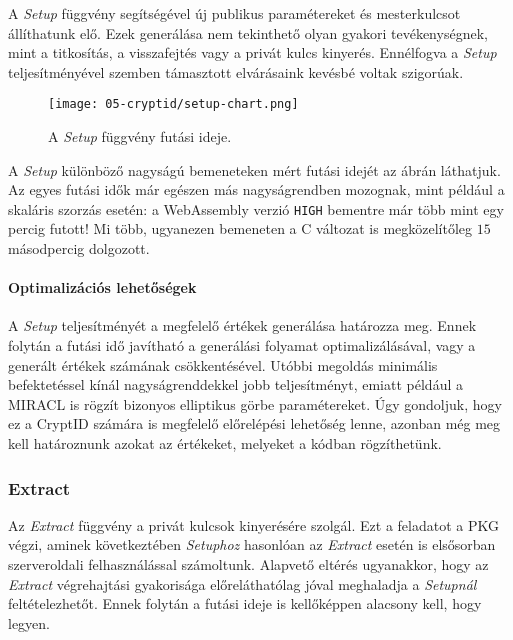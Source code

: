 A \textit{Setup} függvény segítségével új publikus paramétereket és mesterkulcsot állíthatunk elő. Ezek generálása nem tekinthető olyan gyakori tevékenységnek, mint a titkosítás, a visszafejtés vagy a privát kulcs kinyerés. Ennélfogva a \textit{Setup} teljesítményével szemben támasztott elvárásaink kevésbé voltak szigorúak.

\begin{figure}[h]
    \centering
    \texttt{[image: 05-cryptid/setup-chart.png]}
    \caption{A \textit{Setup} függvény futási ideje.}
    \label{Figure::CryptID::SetupChart}
\end{figure}

A \textit{Setup} különböző nagyságú bemeneteken mért futási idejét az  ábrán láthatjuk. Az egyes futási idők már egészen más nagyságrendben mozognak, mint például a skaláris szorzás esetén: a WebAssembly verzió \texttt{HIGH} bementre már több mint egy percig futott! Mi több, ugyanezen bemeneten a C változat is megközelítőleg $15$ másodpercig dolgozott.

\paragraph{Optimalizációs lehetőségek}

A \textit{Setup} teljesítményét a megfelelő értékek generálása határozza meg. Ennek folytán a futási idő javítható a generálási folyamat optimalizálásával, vagy a generált értékek számának csökkentésével. Utóbbi megoldás minimális befektetéssel kínál nagyságrenddekkel jobb teljesítményt, emiatt például a MIRACL is rögzít bizonyos elliptikus görbe paramétereket. Úgy gondoljuk, hogy ez a CryptID számára is megfelelő előrelépési lehetőség lenne, azonban még meg kell határoznunk azokat az értékeket, melyeket a kódban rögzíthetünk.

\subsubsection{Extract}

Az \textit{Extract} függvény a privát kulcsok kinyerésére szolgál. Ezt a feladatot a PKG végzi, aminek következtében \textit{Setuphoz} hasonlóan az \textit{Extract} esetén is elsősorban szerveroldali felhasználással számoltunk. Alapvető eltérés ugyanakkor, hogy az \textit{Extract} végrehajtási gyakorisága előreláthatólag jóval meghaladja a \textit{Setupnál} feltételezhetőt. Ennek folytán a futási ideje is kellőképpen alacsony kell, hogy legyen. 

